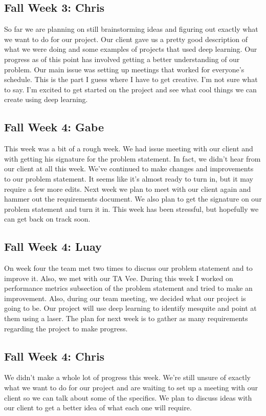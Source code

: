 \documentclass[onecolumn, draftclsnofoot,10pt, compsoc]{IEEEtran}
\begin{document}
\subsection{Fall Week 3: Chris}
So far we are planning on still brainstorming ideas and figuring out exactly what we want to do for our project. Our client gave us a pretty good description of what we were doing and some examples of projects that used deep learning. Our progress as of this point has involved getting a better understanding of our problem. Our main issue was setting up meetings that worked for everyone's schedule. This is the part I guess where I have to get creative. I'm not sure what to say. I'm excited to get started on the project and see what cool things we can create using deep learning.
\subsection{Fall Week 4: Gabe}
This week was a bit of a rough week. We had issue meeting with our client and with getting his signature for the problem statement. In fact, we didn't hear from our client at all this week. We've continued to make changes and improvements to our problem statement. It seems like it's almost ready to turn in, but it may require a few more edits. Next week we plan to meet with our client again and hammer out the requirements document. We also plan to get the signature on our problem statement and turn it in. This week has been stressful, but hopefully we can get back on track soon.
\subsection{Fall Week 4: Luay}
On week four the team met two times to discuss our problem statement and to improve it. Also, we met with our TA Vee. During this week I worked on performance metrics subsection of the problem statement and tried to make an improvement. Also, during our team meeting, we decided what our project is going to be. Our project will use deep learning to identify mesquite and point at them using a laser. The plan for next week is to gather as many requirements regarding the project to make progress.
\subsection{Fall Week 4: Chris}
We didn't make a whole lot of progress this week. We're still unsure of exactly what we want to do for our project and are waiting to set up a meeting with our client so we can talk about some of the specifics. We plan to discuss ideas with our client to get a better idea of what each one will require.
\end{document}
